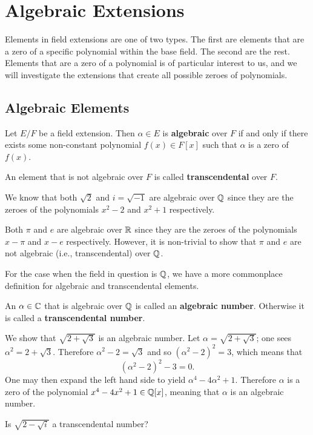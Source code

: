 \chapter{Algebraic Extensions}
Elements in field extensions are one of two types. The first are elements that are a zero of a specific polynomial within the base field. The second are the rest. Elements that are a zero of a polynomial is of particular interest to us, and we will investigate the extensions that create all possible zeroes of polynomials.

\section{Algebraic Elements}
\begin{definition}
    Let $E/F$ be a field extension. Then $\alpha \in E$ is \textbf{algebraic} over $F$ if and only if there exists some non-constant polynomial $f(x) \in F[x]$ such that $\alpha$ is a zero of $f(x)$.

    An element that is not algebraic over $F$ is called \textbf{transcendental} over $F$.
\end{definition}

\begin{example}
    We know that both $\sqrt2$ and $i = \sqrt{-1}$ are algebraic over $\mathbb{Q}$ since they are the zeroes of the polynomials $x^2 - 2$ and $x^2 + 1$ respectively.
\end{example}

\begin{example}
    Both $\pi$ and $e$ are algebraic over $\mathbb{R}$ since they are the zeroes of the polynomials $x - \pi$ and $x - e$ respectively. However, it is non-trivial to show that $\pi$ and $e$ are not algebraic (i.e., transcendental) over $\mathbb{Q}$.
\end{example}

For the case when the field in question is $\mathbb{Q}$, we have a more commonplace definition for algebraic and transcendental elements.

\begin{definition}
    An $\alpha \in \mathbb{C}$ that is algebraic over $\mathbb{Q}$ is called an \textbf{algebraic number}. Otherwise it is called a \textbf{transcendental number}.
\end{definition}

\begin{example}
    We show that $\sqrt{2+\sqrt3}$ is an algebraic number. Let $\alpha = \sqrt{2+\sqrt3}$; one sees $\alpha^2 = 2 + \sqrt3$. Therefore $\alpha^2 - 2 = \sqrt3$ and so $(\alpha^2 - 2)^2 = 3$, which means that
    \[
        (\alpha^2 - 2)^2 - 3 = 0.
    \]
    One may then expand the left hand side to yield $\alpha^4 - 4\alpha^2 + 1$. Therefore $\alpha$ is a zero of the polynomial $x^4 - 4x^2 + 1 \in \mathbb{Q}[x]$, meaning that $\alpha$ is an algebraic number.
\end{example}

\begin{exercise}
    Is $\sqrt{2 - \sqrt{i}}$ a transcendental number?
\end{exercise}

